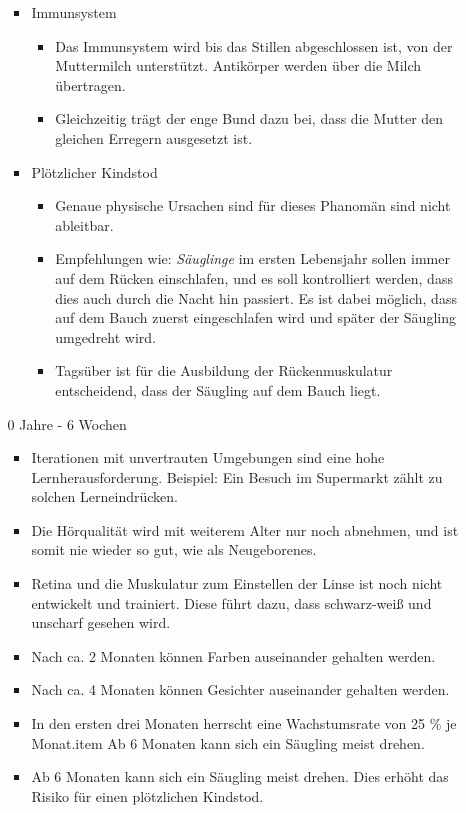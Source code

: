 \begin{itemize}
\begin{enumerate}
\begin{itemize}
		\item Immunsystem
		\begin{itemize}
			\item Das Immunsystem wird bis das Stillen abgeschlossen ist, von der Muttermilch unterstützt. Antikörper werden über die Milch übertragen.
			\item Gleichzeitig trägt der enge Bund dazu bei, dass die Mutter den gleichen Erregern ausgesetzt ist.
		\end{itemize}
		\item Plötzlicher Kindstod
		\begin{itemize}
			\item Genaue physische Ursachen sind für dieses Phanomän sind nicht ableitbar.
			\item Empfehlungen wie: \textit{Säuglinge} im ersten Lebensjahr sollen immer auf dem Rücken einschlafen, und es soll kontrolliert werden, dass dies auch durch die Nacht hin passiert. Es ist dabei möglich, dass auf dem Bauch zuerst eingeschlafen wird und später der Säugling umgedreht wird. 
			\item Tagsüber ist für die Ausbildung der Rückenmuskulatur entscheidend, dass der Säugling auf dem Bauch liegt. 
		\end{itemize}
	\end{itemize}
	\item[0 Jahre - 6 Wochen]
	\begin{itemize}
		\item Iterationen mit unvertrauten Umgebungen sind eine hohe Lernherausforderung. Beispiel: Ein Besuch im Supermarkt zählt zu solchen Lerneindrücken.
		\item Die Hörqualität wird mit weiterem Alter nur noch abnehmen, und ist somit nie wieder so gut, wie als Neugeborenes.
		\item Retina und die Muskulatur zum Einstellen der Linse ist noch nicht entwickelt und trainiert. Diese führt dazu, dass schwarz-weiß und unscharf gesehen wird.
		\item Nach ca. 2 Monaten können Farben auseinander gehalten werden.
		\item Nach ca. 4 Monaten können Gesichter auseinander gehalten werden.
		\item In den ersten drei Monaten herrscht eine Wachstumsrate von 25 $\%$ je Monat.item Ab 6 Monaten kann sich ein Säugling meist drehen.
		\item Ab 6 Monaten kann sich ein Säugling meist drehen. Dies erhöht das Risiko für einen plötzlichen Kindstod.
	\end{itemize}

\end{enumerate}
\end{itemize}
